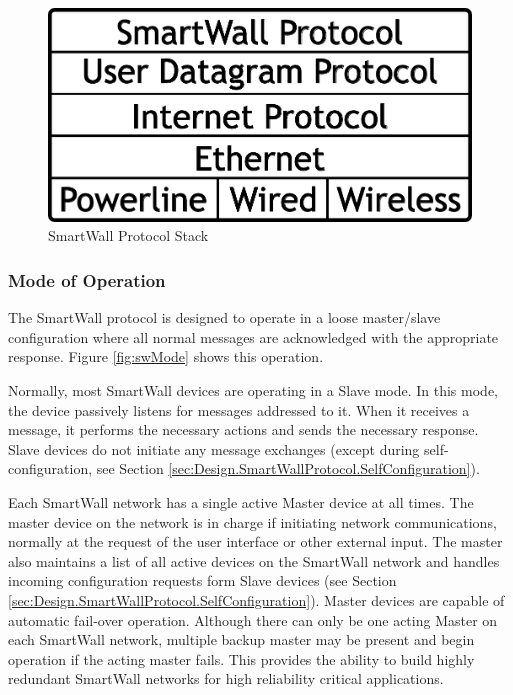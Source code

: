 \documentclass[12pt]{article}
\begin{document}
\begin{figure}
  \begin{center}
    \includegraphics[scale=.5]{stack.pdf}
  \end{center}
  \caption{SmartWall Protocol Stack}
  \label{fig:swStack}
\end{figure}

\subsubsection{Mode of Operation}
\label{sec:Design.SmartWallProtocol.ModeofOperation}
The SmartWall protocol is designed to operate in a loose master/slave
configuration where all normal messages are acknowledged with the
appropriate response. Figure \ref{fig:swMode} shows this operation.

Normally, most SmartWall devices are operating in a
Slave mode. In this mode, the device passively listens for messages
addressed to it. When it receives a message, it performs the necessary
actions and sends the necessary response. Slave devices do not initiate
any message exchanges (except during self-configuration, see Section
\ref{sec:Design.SmartWallProtocol.SelfConfiguration}).

Each SmartWall network has a single active Master device at all
times. The master device on the network is in charge if initiating network
communications, normally at the request of the user interface or other
external input. The master also maintains a list of all active devices
on the SmartWall network and handles incoming configuration requests
form Slave devices (see Section
\ref{sec:Design.SmartWallProtocol.SelfConfiguration}). Master devices
are capable of automatic fail-over operation. Although there can only
be one acting Master on each SmartWall network, multiple backup master
may be present and begin operation if the acting master fails. This
provides the ability to build highly redundant SmartWall networks for
high reliability critical applications.
\end{document}
